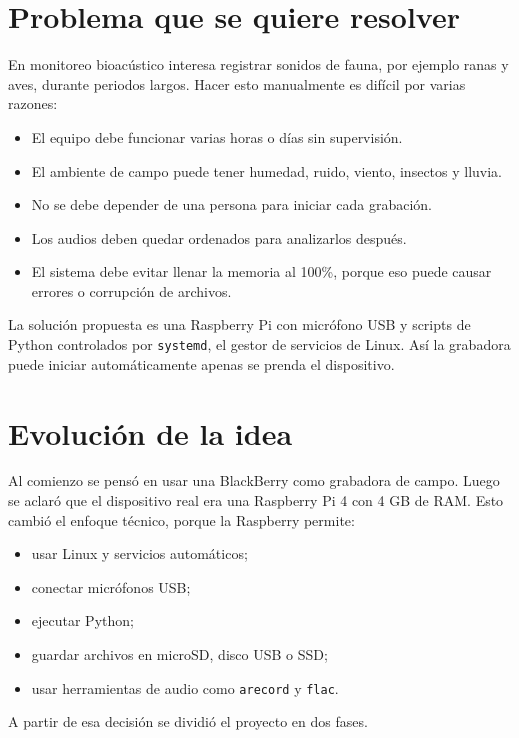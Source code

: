 \documentclass[11pt,letterpaper]{article}
\newcommand{\archivo}[1]{\texttt{#1}}
\begin{document}
\section{Problema que se quiere resolver}

En monitoreo bioacústico interesa registrar sonidos de fauna, por ejemplo ranas y aves, durante periodos largos. Hacer esto manualmente es difícil por varias razones:

\begin{itemize}[leftmargin=*]
  \item El equipo debe funcionar varias horas o días sin supervisión.
  \item El ambiente de campo puede tener humedad, ruido, viento, insectos y lluvia.
  \item No se debe depender de una persona para iniciar cada grabación.
  \item Los audios deben quedar ordenados para analizarlos después.
  \item El sistema debe evitar llenar la memoria al 100\%, porque eso puede causar errores o corrupción de archivos.
\end{itemize}

La solución propuesta es una Raspberry Pi con micrófono USB y scripts de Python controlados por \archivo{systemd}, el gestor de servicios de Linux. Así la grabadora puede iniciar automáticamente apenas se prenda el dispositivo.

\section{Evolución de la idea}

Al comienzo se pensó en usar una BlackBerry como grabadora de campo. Luego se aclaró que el dispositivo real era una Raspberry Pi 4 con 4 GB de RAM. Esto cambió el enfoque técnico, porque la Raspberry permite:

\begin{itemize}[leftmargin=*]
  \item usar Linux y servicios automáticos;
  \item conectar micrófonos USB;
  \item ejecutar Python;
  \item guardar archivos en microSD, disco USB o SSD;
  \item usar herramientas de audio como \archivo{arecord} y \archivo{flac}.
\end{itemize}

A partir de esa decisión se dividió el proyecto en dos fases.
\end{document}
